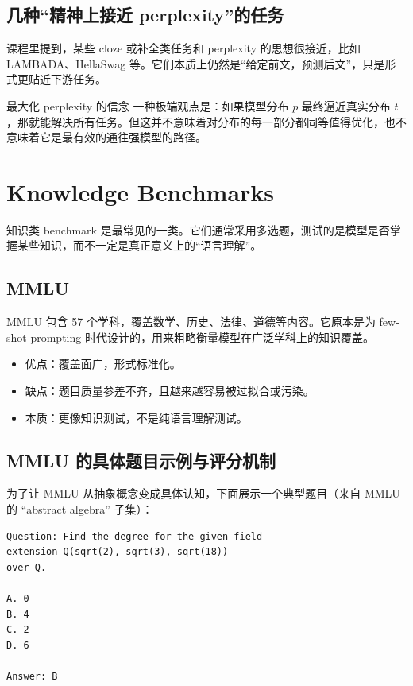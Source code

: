 \documentclass[a4paper]{article}
\begin{document}
\subsection{几种``精神上接近 perplexity''的任务}

课程里提到，某些 cloze 或补全类任务和 perplexity 的思想很接近，比如 LAMBADA、HellaSwag 等。它们本质上仍然是“给定前文，预测后文”，只是形式更贴近下游任务。

\begin{warningbox}{最大化 perplexity 的信念}
一种极端观点是：如果模型分布 $p$ 最终逼近真实分布 $t$，那就能解决所有任务。但这并不意味着对分布的每一部分都同等值得优化，也不意味着它是最有效的通往强模型的路径。
\end{warningbox}

\section{Knowledge Benchmarks}

知识类 benchmark 是最常见的一类。它们通常采用多选题，测试的是模型是否掌握某些知识，而不一定是真正意义上的``语言理解''。

\subsection{MMLU}

MMLU 包含 57 个学科，覆盖数学、历史、法律、道德等内容。它原本是为 few-shot prompting 时代设计的，用来粗略衡量模型在广泛学科上的知识覆盖。

\begin{itemize}
    \item 优点：覆盖面广，形式标准化。
    \item 缺点：题目质量参差不齐，且越来越容易被过拟合或污染。
    \item 本质：更像知识测试，不是纯语言理解测试。
\end{itemize}

\subsection{MMLU 的具体题目示例与评分机制}

为了让 MMLU 从抽象概念变成具体认知，下面展示一个典型题目（来自 MMLU 的 ``abstract algebra'' 子集）：

\begin{lstlisting}[caption={MMLU 典型题目格式（abstract algebra 子集）},language={}]
Question: Find the degree for the given field
extension Q(sqrt(2), sqrt(3), sqrt(18))
over Q.

A. 0
B. 4
C. 2
D. 6

Answer: B
\end{lstlisting}
\end{document}
